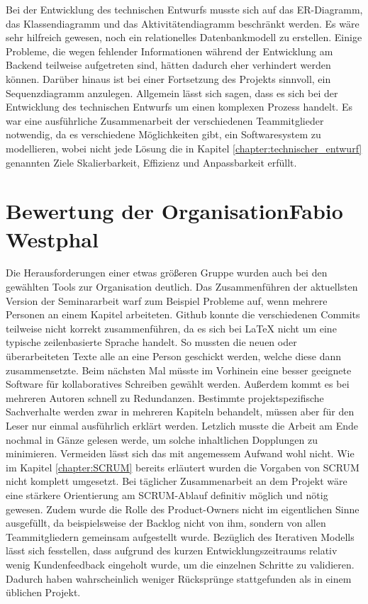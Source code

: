 		Bei der Entwicklung des technischen Entwurfs musste sich auf das ER-Diagramm, das Klassendiagramm und das Aktivitätendiagramm beschränkt werden. Es wäre sehr hilfreich gewesen, noch ein relationelles Datenbankmodell zu erstellen. Einige Probleme, die wegen fehlender Informationen während der Entwicklung am Backend teilweise aufgetreten sind, hätten dadurch eher verhindert werden können. Darüber hinaus ist bei einer Fortsetzung des Projekts sinnvoll, ein Sequenzdiagramm anzulegen. Allgemein lässt sich sagen, dass es sich bei der Entwicklung des technischen Entwurfs um einen komplexen Prozess handelt. Es war eine ausführliche Zusammenarbeit der verschiedenen Teammitglieder notwendig, da es verschiedene Möglichkeiten gibt, ein Softwaresystem zu modellieren, wobei nicht jede Lösung die in Kapitel \ref{chapter:technischer_entwurf} genannten Ziele Skalierbarkeit, Effizienz und Anpassbarkeit erfüllt.
		
	\section[Bewertung der Organisation]{Bewertung der Organisation{\hfill \normalsize Fabio Westphal}}
		Die Herausforderungen einer etwas größeren Gruppe wurden auch bei den gewählten Tools zur Organisation deutlich. Das Zusammenführen der aktuellsten Version der Seminararbeit warf zum Beispiel Probleme auf, wenn mehrere Personen an einem Kapitel arbeiteten. Github konnte die verschiedenen Commits teilweise nicht korrekt zusammenführen, da es sich bei LaTeX nicht um eine typische zeilenbasierte Sprache handelt. So mussten die neuen oder überarbeiteten Texte alle an eine Person geschickt werden, welche diese dann zusammensetzte. Beim nächsten Mal müsste im Vorhinein eine besser geeignete Software für kollaboratives Schreiben gewählt werden. Außerdem kommt es bei mehreren Autoren schnell zu Redundanzen. Bestimmte projektspezifische Sachverhalte werden zwar in mehreren Kapiteln behandelt, müssen aber für den Leser nur einmal ausführlich erklärt werden. Letzlich musste die Arbeit am Ende nochmal in Gänze gelesen werde, um solche inhaltlichen Dopplungen zu minimieren. Vermeiden lässt sich das mit angemessem Aufwand wohl nicht.
		Wie im Kapitel \ref{chapter:SCRUM} bereits erläutert wurden die Vorgaben von SCRUM nicht komplett umgesetzt. Bei täglicher Zusammenarbeit an dem Projekt wäre eine stärkere Orientierung am SCRUM-Ablauf definitiv möglich und nötig gewesen. Zudem wurde die Rolle des Product-Owners nicht im eigentlichen Sinne ausgefüllt, da beispielsweise der Backlog nicht von ihm, sondern von allen Teammitgliedern gemeinsam aufgestellt wurde. Bezüglich des Iterativen Modells lässt sich fesstellen, dass aufgrund des kurzen Entwicklungszeitraums relativ wenig Kundenfeedback eingeholt wurde, um die einzelnen Schritte zu validieren. Dadurch haben wahrscheinlich weniger Rücksprünge stattgefunden als in einem üblichen Projekt. 
		
